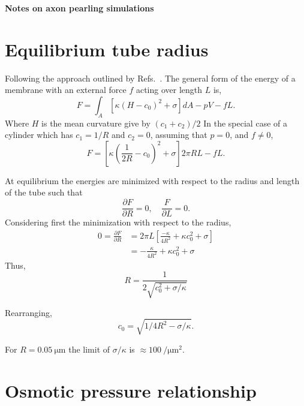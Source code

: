 \documentclass[11pt]{article}
\begin{document}
\begin{centering}
    \textbf{\Large Notes on axon pearling simulations}\\[3mm]
\end{centering}




\section{Equilibrium tube radius}
Following the approach outlined by Refs.~\cite{DerenyiEtAl2002,ShurerEtAl2019}.
The general form of the energy of a membrane with an external force \(f\) acting over length \(L\) is,
\begin{equation}
    F = \int_A \left[\kappa(H - c_0)^2 + \sigma \right]dA - pV - fL.
\end{equation}
Where \(H\) is the mean curvature give by \((c_1 + c_2)/2\)
In the special case of a cylinder which has \(c_1 = 1/R\) and \(c_2 = 0\), assuming that \(p=0\), and \(f\neq 0\),
\begin{equation}
    F = \left[ \kappa\left(\frac{1}{2R} - c_0\right)^2 + \sigma\right] 2\pi RL - fL.
\end{equation}

At equilibrium the energies are minimized with respect to the radius and length of the tube such that
\begin{equation}
    \frac{\partial F}{\partial R} = 0,\quad \frac{F}{\partial L} =0.
\end{equation}
Considering first the minimization with respect to the radius,
\begin{align*}
    0 = \frac{\partial F}{\partial R} & = 2\pi L\left[\frac{-\kappa}{4R^2} + \kappa c_0^2 + \sigma\right] \\
                                      & = - \frac{\kappa}{4R^2} + \kappa c_0^2 + \sigma
\end{align*}
Thus,
\begin{equation}
    \boxed{R = \frac{1}{2\sqrt{c_0^2 + \sigma/\kappa}}}
\end{equation}

Rearranging,
\begin{equation}
    c_0 = \sqrt{1/4R^2 - \sigma/\kappa}.
\end{equation}

For \(R = \SI{0.05}{\micro\meter}\) the limit of \(\sigma/\kappa\) is \(\approx \SI{100}{\per\micro\meter\squared}\).

\section{Osmotic pressure relationship}
\end{document}
